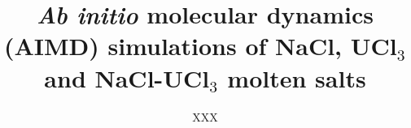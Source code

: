 \documentclass[preprint,3p,10pt,twocolumn,number,sort&compress]{elsarticle}
\begin{document}
\begin{frontmatter}



\title{\textit{Ab initio} molecular dynamics (AIMD) simulations of NaCl, UCl$_3$ and NaCl-UCl$_3$ molten salts}


\author{XXX}


\end{frontmatter}
\end{document}
